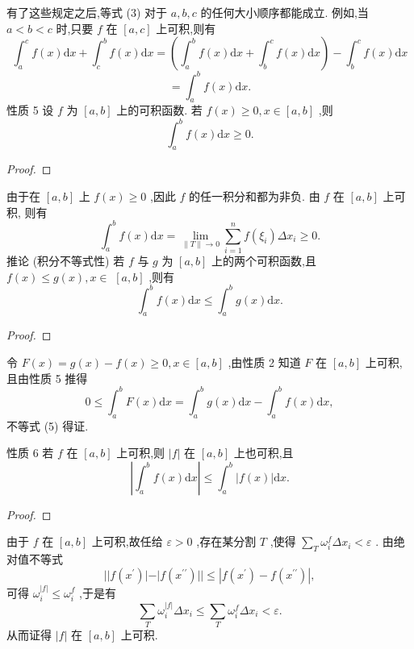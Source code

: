 有了这些规定之后,等式 (3) 对于 \(a,b,c\) 的任何大小顺序都能成立. 例如,当 \(a < b < c\) 时,只要 \(f\) 在 \(\left\lbrack  {a,c}\right\rbrack\) 上可积,则有
\[
{\int }_{a}^{c}f\left( x\right) \mathrm{d}x + {\int }_{c}^{b}f\left( x\right) \mathrm{d}x = \left( {{\int }_{a}^{b}f\left( x\right) \mathrm{d}x + {\int }_{b}^{c}f\left( x\right) \mathrm{d}x}\right)  - {\int }_{b}^{c}f\left( x\right) \mathrm{d}x
\]
\[
= {\int }_{a}^{b}f\left( x\right) \mathrm{d}x.
\]
性质 5 设 \(f\) 为 \(\left\lbrack  {a,b}\right\rbrack\) 上的可积函数. 若 \(f\left( x\right)  \geq  0,x \in  \left\lbrack  {a,b}\right\rbrack\) ,则
\[
{\int }_{a}^{b}f\left( x\right) \mathrm{d}x \geq  0. \tag{4}
\]
\begin{proof}

\end{proof}
由于在 \(\left\lbrack  {a,b}\right\rbrack\) 上 \(f\left( x\right)  \geq  0\) ,因此 \(f\) 的任一积分和都为非负. 由 \(f\) 在 \(\left\lbrack  {a,b}\right\rbrack\) 上可积, 则有
\[
{\int }_{a}^{b}f\left( x\right) \mathrm{d}x = \mathop{\lim }\limits_{{\parallel T\parallel  \rightarrow  0}}\mathop{\sum }\limits_{{i = 1}}^{n}f\left( {\xi }_{i}\right) \Delta {x}_{i} \geq  0.
\]
推论 (积分不等式性) 若 \(f\) 与 \(g\) 为 \(\left\lbrack  {a,b}\right\rbrack\) 上的两个可积函数,且 \(f\left( x\right)  \leq  g\left( x\right) ,x \in\)  \(\left\lbrack  {a,b}\right\rbrack\) ,则有
\[
{\int }_{a}^{b}f\left( x\right) \mathrm{d}x \leq  {\int }_{a}^{b}g\left( x\right) \mathrm{d}x. \tag{5}
\]
\begin{proof}

\end{proof}
令 \(F\left( x\right)  = g\left( x\right)  - f\left( x\right)  \geq  0,x \in  \left\lbrack  {a,b}\right\rbrack\) ,由性质 2 知道 \(F\) 在 \(\left\lbrack  {a,b}\right\rbrack\) 上可积,且由性质 5 推得
\[
0 \leq  {\int }_{a}^{b}F\left( x\right) \mathrm{d}x = {\int }_{a}^{b}g\left( x\right) \mathrm{d}x - {\int }_{a}^{b}f\left( x\right) \mathrm{d}x,
\]
不等式 (5) 得证.

性质 6 若 \(f\) 在 \(\left\lbrack  {a,b}\right\rbrack\) 上可积,则 \(\left| f\right|\) 在 \(\left\lbrack  {a,b}\right\rbrack\) 上也可积,且
\[
\left| {{\int }_{a}^{b}f\left( x\right) \mathrm{d}x}\right|  \leq  {\int }_{a}^{b}\left| {f\left( x\right) }\right| \mathrm{d}x. \tag{6}
\]
\begin{proof}

\end{proof}
由于 \(f\) 在 \(\left\lbrack  {a,b}\right\rbrack\) 上可积,故任给 \(\varepsilon  > 0\) ,存在某分割 \(T\) ,使得 \(\mathop{\sum }\limits_{T}{\omega }_{i}^{f}\Delta {x}_{i} < \varepsilon\) . 由绝对值不等式
\[
\left| \right| f\left( {x}^{\prime }\right) \left| -\right| f\left( {x}^{\prime \prime }\right) \left| \right|  \leq  \left| {f\left( {x}^{\prime }\right)  - f\left( {x}^{\prime \prime }\right) }\right| ,
\]
可得 \({\omega }_{i}^{\left| f\right| } \leq  {\omega }_{i}^{f}\) ,于是有
\[
\mathop{\sum }\limits_{T}{\omega }_{i}^{\left| f\right| }\Delta {x}_{i} \leq  \mathop{\sum }\limits_{T}{\omega }_{i}^{f}\Delta {x}_{i} < \varepsilon .
\]
从而证得 \(\left| f\right|\) 在 \(\left\lbrack  {a,b}\right\rbrack\) 上可积.

